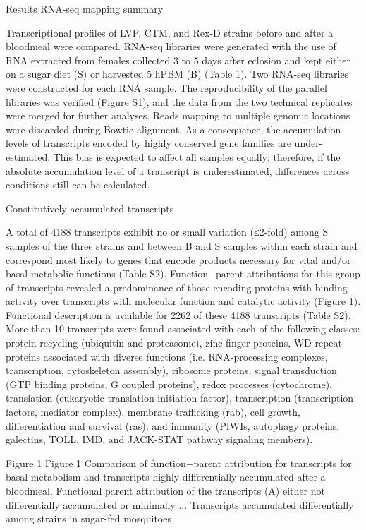 Results
RNA-seq mapping summary

Transcriptional profiles of LVP, CTM, and Rex-D strains before and after a bloodmeal were compared. RNA-seq libraries were generated with the use of RNA extracted from females collected 3 to 5 days after eclosion and kept either on a sugar diet (S) or harvested 5 hPBM (B) (Table 1). Two RNA-seq libraries were constructed for each RNA sample. The reproducibility of the parallel libraries was verified (Figure S1), and the data from the two technical replicates were merged for further analyses. Reads mapping to multiple genomic locations were discarded during Bowtie alignment. As a consequence, the accumulation levels of transcripts encoded by highly conserved gene families are under-estimated. This bias is expected to affect all samples equally; therefore, if the absolute accumulation level of a transcript is underestimated, differences across conditions still can be calculated.



Constitutively accumulated transcripts

A total of 4188 transcripts exhibit no or small variation (≤2-fold) among S samples of the three strains and between B and S samples within each strain and correspond most likely to genes that encode products necessary for vital and/or basal metabolic functions (Table S2). Function−parent attributions for this group of transcripts revealed a predominance of those encoding proteins with binding activity over transcripts with molecular function and catalytic activity (Figure 1). Functional description is available for 2262 of these 4188 transcripts \cite{Lawson2009} (Table S2). More than 10 transcripts were found associated with each of the following classes: protein recycling (ubiquitin and proteasome), zinc finger proteins, WD-repeat proteins associated with diverse functions (i.e. RNA-processing complexes, transcription, cytoskeleton assembly), ribosome proteins, signal transduction (GTP binding proteins, G coupled proteins), redox processes (cytochrome), translation (eukaryotic translation initiation factor), transcription (transcription factors, mediator complex), membrane trafficking (rab), cell growth, differentiation and survival (ras), and immunity (PIWIs, autophagy proteins, galectins, TOLL, IMD, and JACK-STAT pathway signaling members).

Figure 1 
Figure 1 
Comparison of function−parent attribution for transcripts for basal metabolism and transcripts highly differentially accumulated after a bloodmeal. Functional parent attribution of the transcripts (A) either not differentially accumulated or minimally ...
Transcripts accumulated differentially among strains in sugar-fed mosquitoes

